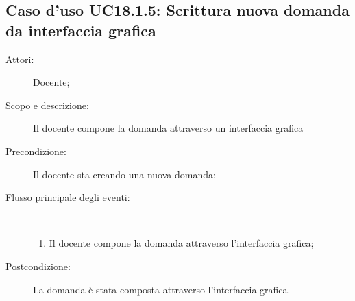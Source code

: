 \subsection{Caso d'uso UC18.1.5: Scrittura nuova domanda da interfaccia grafica}\begin{description}
	\item[Attori:] Docente;
	\item[Scopo e descrizione:] Il docente compone la domanda attraverso un interfaccia grafica
	\item[Precondizione:] Il docente sta creando una nuova domanda;
	
	\item[Flusso principale degli eventi:] \ 
	\begin{enumerate}
		\item Il docente compone la domanda attraverso l'interfaccia grafica;
		
	\end{enumerate}
	\item[Postcondizione:] La domanda è stata composta attraverso l'interfaccia grafica.
\end{description}
\hypertarget{UC18.2}{}
